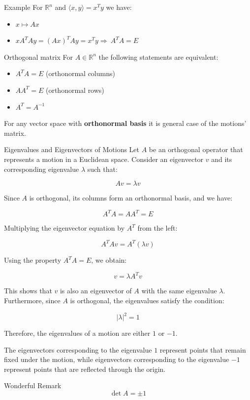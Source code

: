 \documentclass[fullscreen=true, bookmarks=true, hyperref={pdfencoding=unicode}]{beamer}
\begin{document}
\begin{frame}{Example}
  For $\mathbb{R}^n$ and $\langle x, y \rangle = x^Ty$ we have:
  \begin{itemize}
    \item $x \mapsto Ax$
    \item $xA^TAy = (Ax)^TAy = x^Ty \Rightarrow\ A^TA = E$ 
  \end{itemize}

  \pause \vspace{1cm}
  \begin{block}{Orthogonal matrix}
    For $A \in \mathbb{R}^n$ the following statements are equivalent:
    \begin{itemize}
      \item $A^TA = E$ (orthonormal columns)
      \item $AA^T = E$ (orthonormal rows)
      \item $A^T = A^{-1}$
    \end{itemize}    
  \end{block}

  For any vector space with \textbf{orthonormal basis} 
  it is general case of the motions' matrix.
\end{frame}


\begin{frame}{Eigenvalues and Eigenvectors of Motions}
  Let $A$ be an orthogonal operator that represents a motion in a Euclidean space. Consider an eigenvector $v$ and its corresponding eigenvalue $\lambda$ such that:
  
  \[
  Av = \lambda v
  \]
  
  \pause
  Since $A$ is orthogonal, its columns form an orthonormal basis, and we have:
  
  \[
  A^TA = AA^T = E
  \]
  
  \pause
  Multiplying the eigenvector equation by $A^T$ from the left:
  
  \[
  A^TAv = A^T(\lambda v)
  \]
  
  \pause
  Using the property $A^TA = E$, we obtain:
  
  \[
  v = \lambda A^Tv
  \]  
\end{frame}


\begin{frame}
  This shows that $v$ is also an eigenvector of $A$ with the same eigenvalue $\lambda$. Furthermore, since $A$ is orthogonal, the eigenvalues satisfy the condition:
  
  \[
  |\lambda|^2 = 1
  \]
  
  \pause
  Therefore, the eigenvalues of a motion are either $1$ or $-1$. 
  
  \pause
  The eigenvectors corresponding to the eigenvalue $1$ represent points that remain fixed under the motion, while eigenvectors corresponding to the eigenvalue $-1$ represent points that are reflected through the origin.

  \begin{block}{Wonderful Remark}
    $$\det A = \pm 1 $$
  \end{block}
\end{frame}
\end{document}
